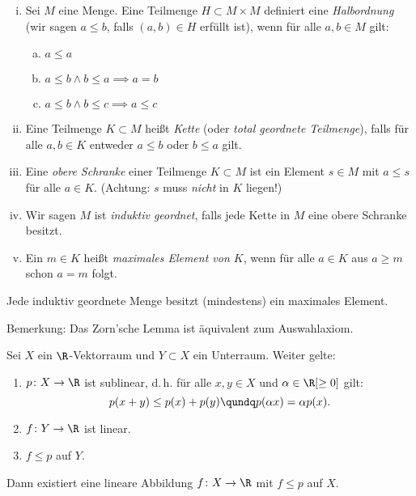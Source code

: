 \thmnoindex%
\begin{thDef}\hfill
    \begin{enumerate}[i)]
        \item
            Sei $M$ eine Menge. Eine Teilmenge $H\subset M\times M$ definiert
            eine \emph{Halbordnung} (wir sagen $a\leq b$, falls $(a,b)\in H$ erfüllt
            ist), wenn für alle $a,b\in M$ gilt:
            \begin{enumerate}[a),labelsep=1em,leftmargin=1.3cm]
                \item $a\leq a$
                \item $a\leq b \wedge b\leq a \implies a=b$
                \item $a\leq b \wedge b\leq c \implies a\leq c$
            \end{enumerate}
        \item
            Eine Teilmenge $K\subset M$ heißt \emph{Kette} (oder \emph{total
            geordnete Teilmenge}), falls für alle $a,b\in K$ entweder $a\leq b$
            oder $b\leq a$ gilt.
        \item
            Eine \emph{obere Schranke} einer Teilmenge $K\subset M$ ist ein
            Element $s\in M$ mit $a\leq s$ für alle $a\in K$. (Achtung: $s$ muss
            \emph{nicht} in $K$ liegen!)
        \item
            Wir sagen $M$ ist \emph{induktiv geordnet}, falls jede Kette in $M$
            eine obere Schranke besitzt.
        \item
            Ein $m\in K$ heißt \emph{maximales Element von $K$}, wenn für alle $a\in K$
            aus $a\geq m$ schon $a=m$ folgt. 
    \end{enumerate}
\end{thDef}

\begin{thEmpty} \label{vl05:zorn}
    Jede induktiv geordnete Menge besitzt (mindestens) ein maximales Element.
    
    Bemerkung: Das Zorn'sche Lemma ist äquivalent zum Auswahlaxiom.
\end{thEmpty}

\begin{thSatz} \label{vl05:hahnbanach}
    Sei $X$ ein $\R$-Vektorraum und $Y\subset X$ ein Unterraum. Weiter gelte:
    \begin{enumerate}[(1)]
        \item 
            $p\colon X\to\R$ ist sublinear, d.\,h. für alle $x,y\in X$ und
            $\alpha\in\R[\geq0]$ gilt:
            \[ p(x+y) \leq p(x) + p(y) \qundq p(\alpha x) = \alpha p(x)  . \]
        \item
            $f\colon Y\to\R$ ist linear.
        \item
            $f\leq p$ auf $Y$.
    \end{enumerate}
    Dann existiert eine lineare Abbildung $f\colon X\to\R$ 
    mit $f\leq p$ auf $X$.
\end{thSatz}

